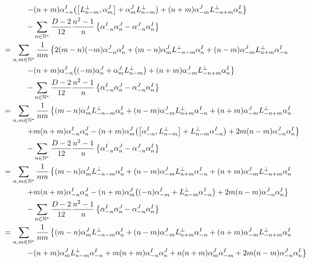\begin{align*}
    &\quad\quad\quad\left.-\qty(n+m)\alpha_{-n}^I\qty(\comm{L^\perp_{n-m}}{\alpha^J_m}+\alpha^J_mL^\perp_{n-m})+\qty(n+m)\alpha_{-m}^JL^\perp_{-n+m}\alpha^I_n\right\}\\
    &\quad\quad\quad-\sum\limits_{n\in\mathbb N^\ast}\frac{D-2}{12}\frac{n^2-1}n\left\{\alpha_{-n}^I\alpha_n^J-\alpha_{-n}^J\alpha^I_n\right\}\\
    &=\sum\limits_{n,m\in\mathbb N^\ast}\frac{1}{nm}\left\{2\qty(m-n)\qty(-m)\alpha^J_{-n}\alpha^I_n+\qty(m-n)\alpha^J_mL^\perp_{-n-m}\alpha^I_n+\qty(n-m)\alpha^J_{-m}L^\perp_{n+m}\alpha^I_{-n}\right.\\
    &\quad\quad\quad\left.-\qty(n+m)\alpha_{-n}^I\qty(\qty(-m)\alpha^J_n+\alpha^J_mL^\perp_{n-m})+\qty(n+m)\alpha_{-m}^JL^\perp_{-n+m}\alpha^I_n\right\}\\
    &\quad\quad\quad-\sum\limits_{n\in\mathbb N^\ast}\frac{D-2}{12}\frac{n^2-1}n\left\{\alpha_{-n}^I\alpha_n^J-\alpha_{-n}^J\alpha^I_n\right\}\\
    &=\sum\limits_{n,m\in\mathbb N^\ast}\frac{1}{nm}\left\{\qty(m-n)\alpha^J_mL^\perp_{-n-m}\alpha^I_n+\qty(n-m)\alpha^J_{-m}L^\perp_{n+m}\alpha^I_{-n}+\qty(n+m)\alpha_{-m}^JL^\perp_{-n+m}\alpha^I_n\right.\\
    &\quad\quad\quad\left.+m\qty(n+m)\alpha_{-n}^I\alpha^J_n-\qty(n+m)\alpha^J_m\qty(\comm{\alpha_{-n}^I}{L^\perp_{n-m}}+L^\perp_{n-m}\alpha_{-n}^I)+2m\qty(n-m)\alpha^J_{-n}\alpha^I_n\right\}\\
    &\quad\quad\quad-\sum\limits_{n\in\mathbb N^\ast}\frac{D-2}{12}\frac{n^2-1}n\left\{\alpha_{-n}^I\alpha_n^J-\alpha_{-n}^J\alpha^I_n\right\}\\
    &=\sum\limits_{n,m\in\mathbb N^\ast}\frac{1}{nm}\left\{\qty(m-n)\alpha^J_mL^\perp_{-n-m}\alpha^I_n+\qty(n-m)\alpha^J_{-m}L^\perp_{n+m}\alpha^I_{-n}+\qty(n+m)\alpha_{-m}^JL^\perp_{-n+m}\alpha^I_n\right.\\
    &\quad\quad\quad\left.+m\qty(n+m)\alpha_{-n}^I\alpha^J_n-\qty(n+m)\alpha^J_m\qty(\qty(-n)\alpha^I_{-m}+L^\perp_{n-m}\alpha_{-n}^I)+2m\qty(n-m)\alpha^J_{-n}\alpha^I_n\right\}\\
    &\quad\quad\quad-\sum\limits_{n\in\mathbb N^\ast}\frac{D-2}{12}\frac{n^2-1}n\left\{\alpha_{-n}^I\alpha_n^J-\alpha_{-n}^J\alpha^I_n\right\}\\
    &=\sum\limits_{n,m\in\mathbb N^\ast}\frac{1}{nm}\left\{\qty(m-n)\alpha^J_mL^\perp_{-n-m}\alpha^I_n+\qty(n-m)\alpha^J_{-m}L^\perp_{n+m}\alpha^I_{-n}+\qty(n+m)\alpha_{-m}^JL^\perp_{-n+m}\alpha^I_n\right.\\
    &\quad\quad\quad\left.-\qty(n+m)\alpha^J_mL^\perp_{n-m}\alpha^I_{-n}+m\qty(n+m)\alpha_{-n}^I\alpha^J_n+n\qty(n+m)\alpha^J_m\alpha^I_{-m}+2m\qty(n-m)\alpha^J_{-n}\alpha^I_n\right\}\\

\end{align*}
